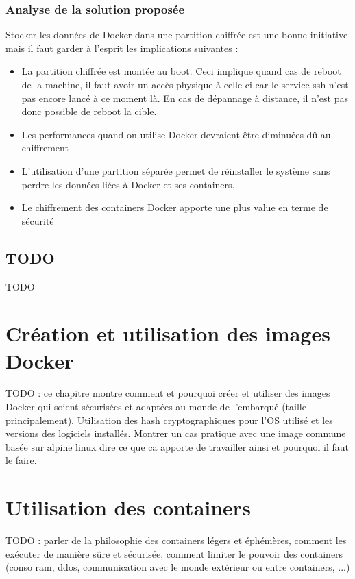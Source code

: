 \documentclass[11pt,a4paper,oneside]{report}
\begin{document}
\subsection{Analyse de la solution proposée}
Stocker les données de Docker dans une partition chiffrée est une bonne initiative mais il faut garder à l'esprit les implications suivantes :
\begin{itemize}

\item La partition chiffrée est montée au boot. Ceci implique quand cas de reboot de la machine, il faut avoir un accès physique à celle-ci car le service ssh n'est pas encore lancé à ce moment là. En cas de dépannage à distance, il n'est pas donc possible de reboot la cible.
\item Les performances quand on utilise Docker devraient être diminuées dû au chiffrement
\item L'utilisation d'une partition séparée permet de réinstaller le système sans perdre les données liées à Docker et ses containers.
\item Le chiffrement des containers Docker apporte une plus value en terme de sécurité
\end{itemize}

\section{TODO}
TODO


\chapter{Création et utilisation des images Docker}\label{creation_utilisation_images_docker}
TODO : ce chapitre montre comment et pourquoi créer et utiliser des images Docker qui soient sécurisées et adaptées au monde de l'embarqué (taille principalement). Utilisation des hash cryptographiques pour l'OS utilisé et les versions des logiciels installés. 
Montrer un cas pratique avec une image commune basée sur alpine linux dire ce que ca apporte de travailler ainsi et pourquoi il faut le faire.


\chapter{Utilisation des containers}\label{utilisation_containers}
TODO : parler de la philosophie des containers légers et éphémères, comment les exécuter de manière sûre et sécurisée, comment limiter le pouvoir des containers (conso ram, ddos, communication avec le monde extérieur ou entre containers, ...)
\end{document}
